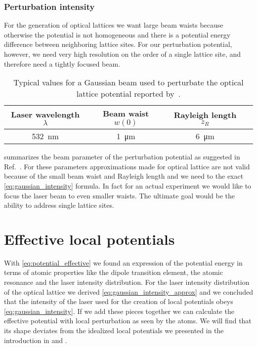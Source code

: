 \subsubsection{Perturbation intensity}

For the generation of optical lattices we want large beam waists because
otherwise the potential is not homogeneous and there is a potential energy
difference between neighboring lattice sites. For our perturbation potential,
however, we need very high resolution on the order of a single lattice site,
and therefore need a tightly focused beam.
\begin{table}[ht]
  \centering
  \begin{tabular}{cccc}
    \toprule
    Laser wavelength $\lambda$ &
    Beam waist $w(0)$ &
    Rayleigh length $z_R$ \\
    \midrule
    \SI{532}{\nano\meter} &
    \SI{1}{\micro\meter} &
    \SI{6}{\micro\meter} \\
    \bottomrule
  \end{tabular}
  \captionsetup{width=.8\textwidth}
  \caption{Typical values for a Gaussian beam used to perturbate the optical
    lattice potential reported by~\cite{Hertlein2017}.
  }\label{tab:gaussian_beam_perturbation}
\end{table}
 summarizes the beam parameter of the
perturbation potential as suggested in Ref.~\cite{Hertlein2017}. For these
parameters approximations made for optical lattice are not valid because of
the small beam waist and Rayleigh length and we need to the exact
\cref{eq:gaussian_intensity} formula. In fact for an actual experiment we
would like to focus the laser beam to even smaller waists. The ultimate goal
would be the ability to address single lattice sites.

\section{Effective local potentials}

With \cref{eq:potential_effective} we found an expression of the potential
energy in terms of atomic properties like the dipole transition element, the
atomic resonance and the laser intensity distribution. For the laser intensity
distribution of the optical lattice we derived
\cref{eq:gaussian_intensity_approx} and we concluded that the intensity of the
laser used for the creation of local potentials obeys
\cref{eq:gaussian_intensity}. If we add these pieces together we can calculate
the effective potential with local perturbation as seen by the atoms. We will
find that its shape deviates from the idealized local potentials we presented
in the introduction in  and 
.

